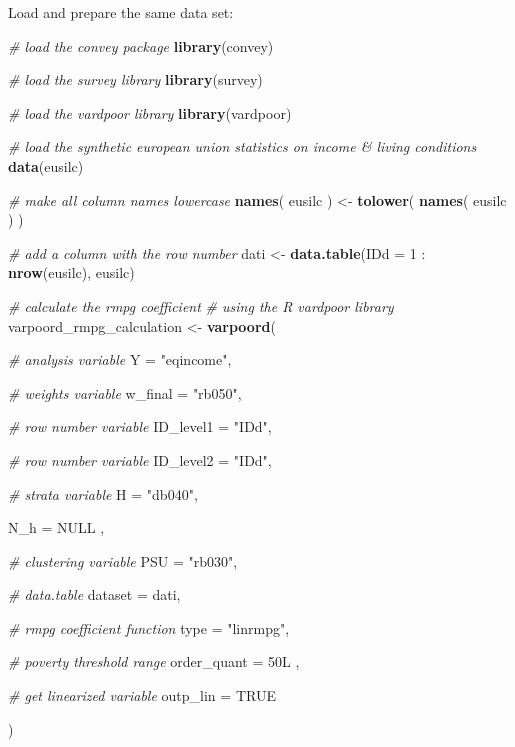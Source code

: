 \documentclass[]{book}
\newenvironment{Shaded}{\begin{snugshade}}{\end{snugshade}}
\newcommand{\KeywordTok}[1]{\textcolor[rgb]{0.13,0.29,0.53}{\textbf{{#1}}}}
\newcommand{\DataTypeTok}[1]{\textcolor[rgb]{0.13,0.29,0.53}{{#1}}}
\newcommand{\DecValTok}[1]{\textcolor[rgb]{0.00,0.00,0.81}{{#1}}}
\newcommand{\StringTok}[1]{\textcolor[rgb]{0.31,0.60,0.02}{{#1}}}
\newcommand{\CommentTok}[1]{\textcolor[rgb]{0.56,0.35,0.01}{\textit{{#1}}}}
\newcommand{\OtherTok}[1]{\textcolor[rgb]{0.56,0.35,0.01}{{#1}}}
\newcommand{\NormalTok}[1]{{#1}}
\begin{document}
Load and prepare the same data set:

\begin{Shaded}
\begin{Highlighting}[]
\CommentTok{# load the convey package}
\KeywordTok{library}\NormalTok{(convey)}

\CommentTok{# load the survey library}
\KeywordTok{library}\NormalTok{(survey)}

\CommentTok{# load the vardpoor library}
\KeywordTok{library}\NormalTok{(vardpoor)}

\CommentTok{# load the synthetic european union statistics on income & living conditions}
\KeywordTok{data}\NormalTok{(eusilc)}

\CommentTok{# make all column names lowercase}
\KeywordTok{names}\NormalTok{( eusilc ) <-}\StringTok{ }\KeywordTok{tolower}\NormalTok{( }\KeywordTok{names}\NormalTok{( eusilc ) )}

\CommentTok{# add a column with the row number}
\NormalTok{dati <-}\StringTok{ }\KeywordTok{data.table}\NormalTok{(}\DataTypeTok{IDd =} \DecValTok{1} \NormalTok{:}\StringTok{ }\KeywordTok{nrow}\NormalTok{(eusilc), eusilc)}

\CommentTok{# calculate the rmpg coefficient}
\CommentTok{# using the R vardpoor library}
\NormalTok{varpoord_rmpg_calculation <-}
\StringTok{    }\KeywordTok{varpoord}\NormalTok{(}
    
        \CommentTok{# analysis variable}
        \DataTypeTok{Y =} \StringTok{"eqincome"}\NormalTok{, }
        
        \CommentTok{# weights variable}
        \DataTypeTok{w_final =} \StringTok{"rb050"}\NormalTok{,}
        
        \CommentTok{# row number variable}
        \DataTypeTok{ID_level1 =} \StringTok{"IDd"}\NormalTok{,}

        \CommentTok{# row number variable}
        \DataTypeTok{ID_level2 =} \StringTok{"IDd"}\NormalTok{,}
                
        \CommentTok{# strata variable}
        \DataTypeTok{H =} \StringTok{"db040"}\NormalTok{, }
        
        \DataTypeTok{N_h =} \OtherTok{NULL} \NormalTok{,}
        
        \CommentTok{# clustering variable}
        \DataTypeTok{PSU =} \StringTok{"rb030"}\NormalTok{, }
        
        \CommentTok{# data.table}
        \DataTypeTok{dataset =} \NormalTok{dati, }
        
        \CommentTok{# rmpg coefficient function}
        \DataTypeTok{type =} \StringTok{"linrmpg"}\NormalTok{,}
      
      \CommentTok{# poverty threshold range}
      \DataTypeTok{order_quant =} \NormalTok{50L ,}
      
      \CommentTok{# get linearized variable}
      \DataTypeTok{outp_lin =} \OtherTok{TRUE}
        
    \NormalTok{)}
\end{Highlighting}
\end{Shaded}
\end{document}
